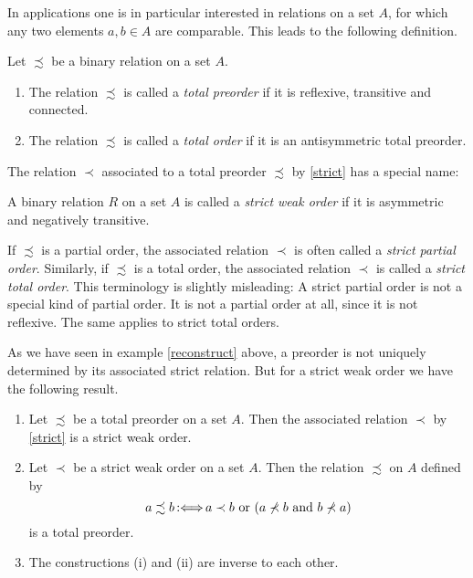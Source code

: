 ﻿\documentclass[a4paper,11pt,twoside,final]{article}
\newcommand{\defby}{\mbox{\ensuremath{\,:\Longleftrightarrow\,}}\xspace}
\numberwithin{equation}{subsection}
\begin{document}
In applications one is in particular interested in relations on a set $A$, for which any two elements $a,b\in A$ are comparable. This leads to the following definition.
\begin{defi}
Let $\precsim$ be a binary relation on a set $A$.
\begin{enumerate}
\item The relation $\precsim$ is called a \emph{total preorder} if it is reflexive, transitive and connected.
\item The relation $\precsim$ is called a \emph{total order} if it is an antisymmetric total preorder.
\end{enumerate}
\end{defi}

The relation $\prec$ associated to a total preorder $\precsim$ by \ref{strict} has a special name:
\begin{defi}
A binary relation $R$ on a set $A$ is called a \emph{strict weak order} if it is asymmetric and negatively transitive.
\end{defi}

\begin{rem}
If $\precsim$ is a partial order, the associated relation $\prec$ is often called a \emph{strict partial order}. Similarly, if $\precsim$ is a total order, the associated relation $\prec$ is called a \emph{strict total order}. This terminology is slightly misleading: A strict partial order is not a special kind of partial order. It is not a partial order at all, since it is not reflexive. The same applies to strict total orders.
\end{rem}

As we have seen in example \ref{reconstruct} above, a preorder is not uniquely determined by its associated strict relation. But for a strict weak order we have the following result.
\begin{prop}
\begin{enumerate}
\item Let $\precsim$ be a total preorder on a set $A$. Then the associated relation $\prec$ by \ref{strict} is a strict weak order.
\item Let $\prec$ be a strict weak order on a set $A$. Then the relation $\precsim$ on $A$ defined by
\begin{equation*}
a \precsim b\defby a \prec b \text{ or } (a\nprec b\text{ and } b\nprec a)
\end{equation*}
is a total preorder.
\item The constructions (i) and (ii) are inverse to each other.
\end{enumerate}
\end{prop}
\end{document}
